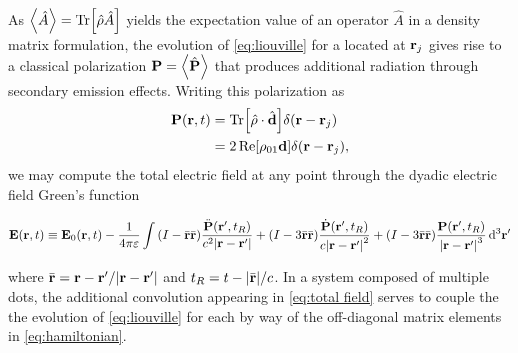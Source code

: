 As $\expval{\hat{A}} = \Tr[\hat{\rho}\hat{A}]$ yields the expectation value of an operator $\hat{A}$ in a density matrix formulation, the evolution of \cref{eq:liouville} for a \qd{} located at $\vb{r}_j$ gives rise to a classical polarization $\vb{P} = \expval{\hat{\vb{P}}}$ that produces additional radiation through secondary emission effects.
Writing this polarization as
\begin{equation}
  \begin{aligned}
    \vb{P}(\vb{r}, t) &= \Tr[\hat{\rho} \cdot \hat{\vb{d}}] \delta(\vb{r} - \vb{r}_j) \\
                      &= 2 \Re[\rho_{01}\vb{d}]\delta(\vb{r} - \vb{r}_j),
  \end{aligned}
\end{equation}
we may compute the total electric field at any point through the dyadic electric field Green's function\cite{Rothwell2008}
\begin{widetext}
  \begin{equation}
    \vb{E}(\vb{r}, t) \equiv \vb{E}_0(\vb{r}, t) - \frac{1}{4\pi\varepsilon} \int
      \qty(I - \bar{\vb{r}} \bar{\vb{r}}) \frac{\ddot{\vb{P}}(\vb{r}', t_R)}{c^2\abs{\vb{r} - \vb{r}'}} +
      \qty(I - 3\bar{\vb{r}} \bar{\vb{r}}) \frac{\dot{\vb{P}}(\vb{r}', t_R)}{c\abs{\vb{r} - \vb{r}'}^2} +
      \qty(I - 3\bar{\vb{r}} \bar{\vb{r}}) \frac{\vb{P}(\vb{r}', t_R)}{\abs{\vb{r} - \vb{r}'}^3}
    \dd[3]{\vb{r}'}
    \label{eq:total field}
  \end{equation}
\end{widetext}
where $\bar{\vb{r}} = \vb{r} - \vb{r}'/\abs{\vb{r} - \vb{r}'}$ and $t_R = t - \abs{\bar{\vb{r}}}/c$.
In a system composed of multiple dots, the additional convolution appearing in \cref{eq:total field} serves to couple the the evolution of \cref{eq:liouville} for each \qd{} by way of the off-diagonal matrix elements in \cref{eq:hamiltonian}.
